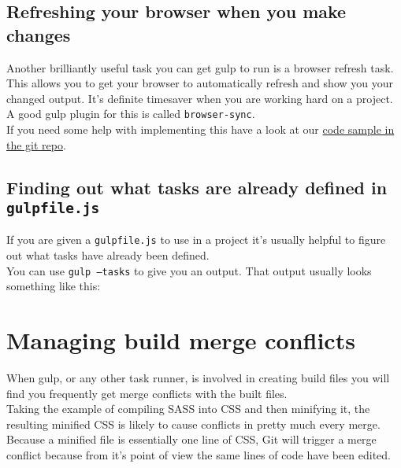 \subsection{Refreshing your browser when you make changes}

Another brilliantly useful task you can get gulp to run is a browser refresh task.
\\

This allows you to get your browser to automatically refresh and show you your changed output. It's definite timesaver when you are working hard on a project.
\\

A good gulp plugin for this is called \texttt{browser-sync}.
\\

If you need some help with implementing this have a look at our \href{https://gist.github.com/oliward/426a6a89bda3d55c614b495431290ba4}{code sample in the git repo}.
\\


\subsection{Finding out what tasks are already defined in \texttt{gulpfile.js}}

If you are given a \texttt{gulpfile.js} to use in a project it's usually helpful to figure out what tasks have already been defined.
\\

You can use \texttt{gulp --tasks} to give you an output. That output usually looks something like this:
\\






\section{Managing build merge conflicts}

When gulp, or any other task runner, is involved in creating build files you will find you frequently get merge conflicts with the built files.
\\

Taking the example of compiling SASS into CSS and then minifying it, the resulting minified CSS is likely to cause conflicts in pretty much every merge. Because a minified file is essentially one line of CSS, Git will trigger a merge conflict because from it's point of view the same lines of code have been edited.
\\

